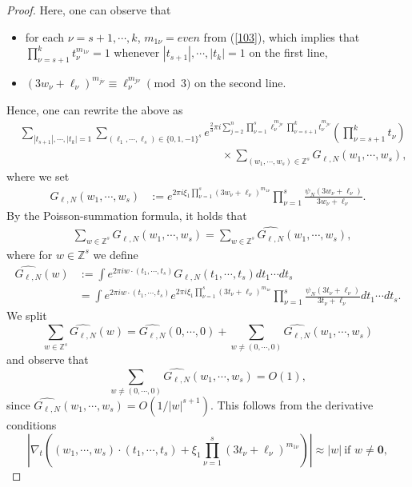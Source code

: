 \documentclass[10pt,a4paper]{amsart}
\numberwithin{equation}{section}
\begin{document}
\begin{proof}
Here, one can observe that
\begin{itemize}
\item for each $\nu=s+1,\cdots,k$, $m_{1\nu}=even$ from (\ref{103}), which implies that  $\prod_{\nu=s+1}^k t_\nu^{m_{1\nu}}=1$ whenever $|t_{s+1}|,\cdots,|t_k|=1$  on the first line,
\item $(3w_\nu+\ell_\nu)^{m_{j\nu}}\equiv \ell_\nu^{m_{j\nu}} \pmod{3}$ on the second line.
\end{itemize}
Hence, one can rewrite the above as
\begin{align*}
&\sum_{|t_{s+1}|,\cdots,|t_k|=1}  \sum_{(\ell_1,\cdots,\ell_s)\in\{0,1,-1\}^s} e^{\frac{2}{3}\pi i 
 \sum_{j=2}^n \prod_{\nu=1}^s \ell_\nu^{m_{j\nu}} \prod_{\nu=s+1}^k t_\nu^{m_{j\nu}}  }\left(\prod_{\nu=s+1}^k t_{\nu}\right)\\
&\qquad\qquad\qquad\qquad\qquad\qquad\qquad\qquad\qquad \times\sum_{(w_1,\cdots,w_s)\in \mathbb{Z}^s}
 G_{\ell,N}(w_1,\cdots,w_s),
\end{align*}
where we set
\begin{align}
G_{\ell,N}(w_1,\cdots,w_s)&:= e^{2\pi i \xi_1 \prod_{\nu=1}^s(3w_\nu+\ell_\nu)^{m_{1\nu}} } \prod_{\nu=1}^s\frac{\psi_{N}(3w_\nu+\ell_\nu)}{3w_\nu+\ell_\nu}.\nonumber
\end{align}
		By the Poisson-summation formula, it holds that
\begin{align*}
&\sum_{w\in \mathbb{Z}^s} G_{\ell,N}(w_1,\cdots,w_s)=\sum_{w\in \mathbb{Z}^s} \widehat{G_{\ell,N}}(w_1,\cdots,w_s),\end{align*}
where for $w\in \mathbb{Z}^s$ we define
\begin{align*}
\widehat{G_{\ell,N}}(w)&:=\int e^{2\pi i w\cdot (t_1,\cdots,t_s)} G_{\ell,N}(t_1,\cdots,t_s) dt_1\cdots dt_s\\
& = \int e^{2\pi i w\cdot (t_1,\cdots,t_s)}  e^{2\pi i \xi_1 \prod_{\nu=1}^s(3t_\nu+\ell_\nu)^{m_{1\nu}} } \prod_{\nu=1}^s\frac{\psi_{N}(3t_\nu+\ell_\nu)}{3t_\nu+\ell_\nu}dt_1\cdots dt_s.
		\end{align*}
	We split
	$$\sum_{w\in \mathbb{Z}^s} \widehat{G_{\ell,N}}(w)=\widehat{G_{\ell,N}}(0,\cdots,0)+\sum_{w\ne (0,\cdots,0)} \widehat{G_{\ell,N}}(w_1,\cdots,w_s)$$
	and observe that 
	$$\sum_{w\ne (0,\cdots, 0)} \widehat{G_{\ell,N}}(w_1,\cdots,w_s)=O(1),$$
since $ \widehat{G_{\ell,N}}(w_1,\cdots,w_s)=O(1/|w|^{s+1})$. This follows from the derivative conditions 
$$\left|\nabla_{t} \left((w_1,\cdots,w_s)\cdot (t_1,\cdots,t_s)+ \xi_1 \prod_{\nu=1}^s(3t_\nu+\ell_\nu)^{m_{1\nu}}\right)\right|\approx |w|\ \text{if $w\ne \textbf{0}$},$$

\end{proof}
\end{document}

